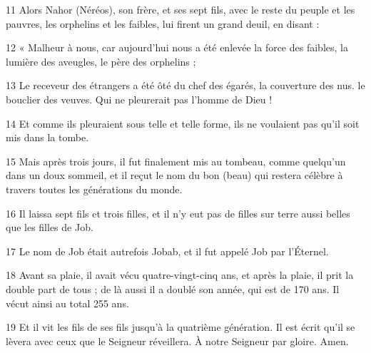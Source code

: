 \par 11 Alors Nahor (Néréos), son frère, et ses sept fils, avec le reste du peuple et les pauvres, les orphelins et les faibles, lui firent un grand deuil, en disant :

\par 12 « Malheur à nous, car aujourd'hui nous a été enlevée la force des faibles, la lumière des aveugles, le père des orphelins ;

\par 13 Le receveur des étrangers a été ôté du chef des égarés, la couverture des nus. le bouclier des veuves. Qui ne pleurerait pas l’homme de Dieu !

\par 14 Et comme ils pleuraient sous telle et telle forme, ils ne voulaient pas qu'il soit mis dans la tombe.

\par 15 Mais après trois jours, il fut finalement mis au tombeau, comme quelqu'un dans un doux sommeil, et il reçut le nom du bon (beau) qui restera célèbre à travers toutes les générations du monde.

\par 16 Il laissa sept fils et trois filles, et il n'y eut pas de filles sur terre aussi belles que les filles de Job.

\par 17 Le nom de Job était autrefois Jobab, et il fut appelé Job par l'Éternel.

\par 18 Avant sa plaie, il avait vécu quatre-vingt-cinq ans, et après la plaie, il prit la double part de tous ; de là aussi il a doublé son année, qui est de 170 ans. Il vécut ainsi au total 255 ans.

\par 19 Et il vit les fils de ses fils jusqu'à la quatrième génération. Il est écrit qu'il se lèvera avec ceux que le Seigneur réveillera. À notre Seigneur par gloire. Amen.

